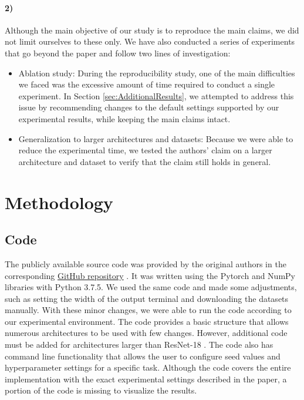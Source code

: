 \paragraph{2)}

 Although the main objective of our study is to reproduce the main claims, we did not limit ourselves to these only. We have also conducted a series of experiments that go beyond the paper and follow two lines of investigation:
\begin{itemize}
    \item Ablation study: During the reproducibility study, one of the main difficulties we faced was the excessive amount of time required to conduct a single experiment. In Section \ref{sec:AdditionalResults}, we attempted to address this issue by recommending changes to the default settings supported by our experimental results, while keeping the main claims intact.
    \item Generalization to larger architectures and datasets: Because we were able to reduce the experimental time, we tested the authors' claim on a larger architecture and dataset to verify that the claim still holds in general.
\end{itemize}


\section{Methodology}
\label{sec:Methodology}
\subsection{Code}
The publicly available source code was provided by the original authors in the corresponding \href{https://github.com/ceciliaresearch/nondeterminism_instability}{GitHub repository} . It was written using the Pytorch \cite{paszke2019pytorch} and NumPy libraries with Python 3.7.5. We used the same code and made some adjustments, such as setting the width of the output terminal and downloading the datasets manually. With these minor changes, we were able to run the code according to our experimental environment. The code provides a basic structure that allows numerous architectures to be used with few changes. However, additional code must be added for architectures larger than ResNet-18 \cite{he2016deep}. The code also has command line functionality that allows the user to configure seed values and hyperparameter settings for a specific task. Although the code covers the entire implementation with the exact experimental settings described in the paper, a portion of the code is missing to visualize the results.

